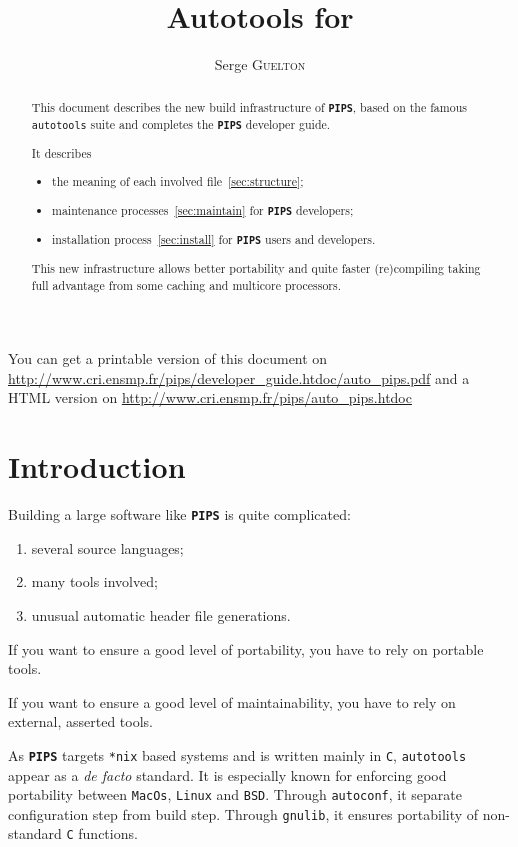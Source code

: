 \documentclass[a4paper]{article}
\title{Autotools for \PIPS{}}
\author{Serge \textsc{Guelton}}
\newcommand{\PIPS}{\textbf{\texttt{PIPS}}}
\newcommand{\autoconf}{\texttt{autoconf}}
\newcommand{\gnulib}{\texttt{gnulib}}
\newcommand{\PipsAutotoolsGuidePDF}{\url{http://www.cri.ensmp.fr/pips/developer_guide.htdoc/auto_pips.pdf}\xspace}
\newcommand{\PipsAutotoolsGuideHTDOC}{\url{http://www.cri.ensmp.fr/pips/auto_pips.htdoc}\xspace}
\begin{document}
\maketitle

\begin{abstract}
This document describes the new build infrastructure of \PIPS{},
 based on the famous \texttt{autotools} suite and completes the \PIPS{}
 developer guide.

It describes
\begin{itemize}
\item the meaning of each involved file~\ref{sec:structure};
\item maintenance processes~\ref{sec:maintain} for \PIPS{} developers;
\item installation process~\ref{sec:install} for \PIPS{} users and developers.
\end{itemize}

This new infrastructure allows better portability and quite faster
(re)compiling taking full advantage from some caching and multicore
processors.
\end{abstract}

You can get a printable version of this document on\\
\PipsAutotoolsGuidePDF{} and a HTML version on \PipsAutotoolsGuideHTDOC

\section{Introduction}

Building a large software like \PIPS{} is quite complicated:
\begin{enumerate}
\item several source languages;
\item many tools involved;
\item unusual automatic header file generations.
\end{enumerate}

If you want to ensure a good level of portability,
you have to rely on portable tools.

If you want to ensure a good level of maintainability,
you have to rely on external, asserted tools.

As \PIPS{} targets \texttt{*nix} based systems and is written mainly in \texttt{C},
\texttt{autotools} appear as a \emph{de facto} standard.
It is especially known for enforcing good portability between \texttt{MacOs}, \texttt{Linux} and \texttt{BSD}.
Through \autoconf{}, it separate configuration step from build step.
Through \gnulib{}, it ensures portability of non-standard \texttt{C} functions.
\end{document}

